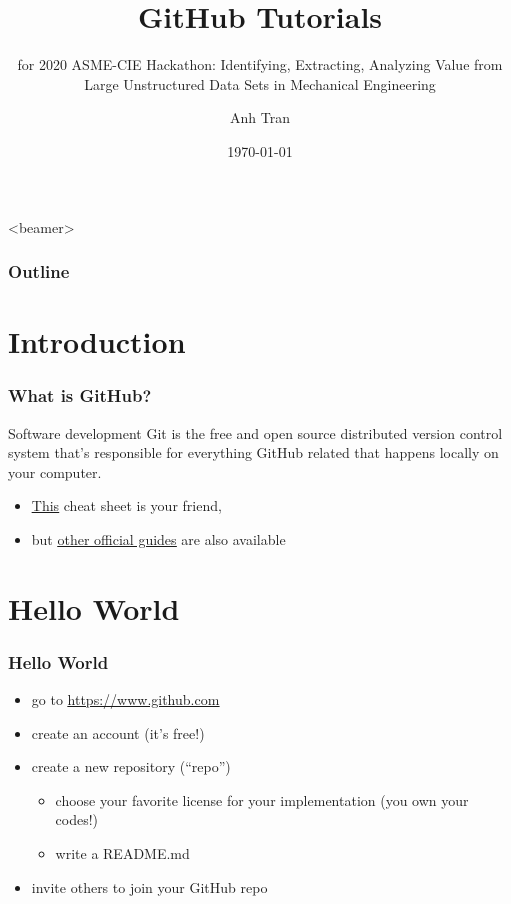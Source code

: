 \documentclass{beamer}
\title[GitHub Tutorials]
{GitHub Tutorials}
\subtitle
{for 2020 ASME-CIE Hackathon: Identifying, Extracting, Analyzing Value from Large Unstructured Data Sets in Mechanical Engineering}
\author[Anh Tran]{Anh Tran}
\institute
{
 Optimization and Uncertainty Quantification Department \\
 Computer Science Research Institute \\
 Sandia National Laboratories \\
}
\date{\today}
\begin{document}

\begin{frame}
 \titlepage
\end{frame}

\begin{frame}<beamer>
 \frametitle{Outline}
 \tableofcontents
\end{frame}

\section{Introduction}

\begin{frame}
\frametitle{What is GitHub?}

\begin{block}{Software development}
Git is the free and open source distributed version control system that's responsible for everything GitHub related that happens locally on your computer. 
\end{block}



\begin{itemize}
\item \href{https://education.github.com/git-cheat-sheet-education.pdf}{\underline{This}} cheat sheet is your friend,
\item but \href{https://guides.github.com/}{\underline{other official guides}} are also available


\end{itemize}

\end{frame}


\section{Hello World}

\begin{frame}
\frametitle{Hello World}

\begin{itemize}
\item go to \href{https://www.github.com}{\underline{https://www.github.com}}
\item create an account (it's free!)
\item create a new repository (``repo'')
\begin{itemize}
\item choose your favorite license for your implementation (you own your codes!)
\item write a README.md
\end{itemize}
\item invite others to join your GitHub repo
\end{itemize}

\end{frame}
\end{document}
